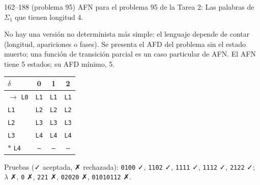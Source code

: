 \documentclass[11pt]{article}
\begin{document}
\begin{ejercicio}{162--188 (problema 95)}{}
AFN para el problema 95 de la Tarea 2: Las palabras de $\Sigma_1$ que tienen longitud 4.
\end{ejercicio}
\proc No hay una versión no determinista más simple: el lenguaje depende de contar (longitud, apariciones o fases). Se presenta el AFD del problema sin el estado muerto; una función de transición parcial es un caso particular de AFN. El AFN tiene 5 estados; su AFD mínimo, 5.
\begin{center}\small\begin{tabular}{lccc}\toprule
$\delta$ & 0 & 1 & 2 \\\midrule
$\to$ \texttt{L0} & \texttt{L1} & \texttt{L1} & \texttt{L1} \\
 \texttt{L1} & \texttt{L2} & \texttt{L2} & \texttt{L2} \\
 \texttt{L2} & \texttt{L3} & \texttt{L3} & \texttt{L3} \\
 \texttt{L3} & \texttt{L4} & \texttt{L4} & \texttt{L4} \\
$*$ \texttt{L4} & \texttt{--} & \texttt{--} & \texttt{--} \\
\bottomrule\end{tabular}\end{center}
Pruebas (✓ aceptada, ✗ rechazada): \texttt{0100} ✓, \texttt{1102} ✓, \texttt{1111} ✓, \texttt{1112} ✓, \texttt{2122} ✓; $\lambda$ ✗, \texttt{0} ✗, \texttt{221} ✗, \texttt{02020} ✗, \texttt{01010112} ✗.
\end{document}
